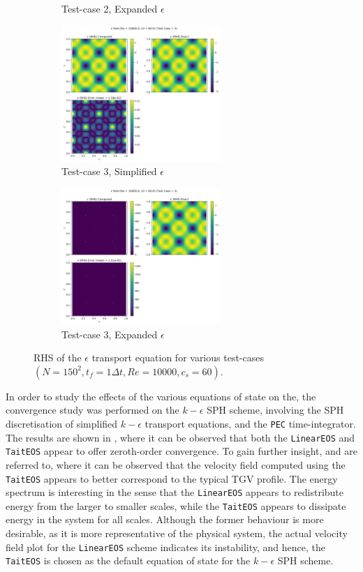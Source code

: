 \begin{figure}[H]
\begin{subfigure}{7cm}
    \caption{Test-case 2, Expanded $\epsilon$}
  \end{subfigure}
  \begin{subfigure}{7cm}
    \centering\includegraphics[width=6cm]{Code-Figures/keps/keps-op-conv/c0_60_ke_expd_no_ketc_3_nx_150_re_10000/eps_rhs.png}
    \caption{Test-case 3, Simplified $\epsilon$}
  \end{subfigure}
  \begin{subfigure}{7cm}
    \centering\includegraphics[width=6cm]{Code-Figures/keps/keps-op-conv/c0_60_ke_expd_yes_ketc_3_nx_150_re_10000/eps_rhs.png}
    \caption{Test-case 3, Expanded $\epsilon$}
  \end{subfigure}
  \caption{RHS of the $\epsilon$ transport equation for various test-cases $(N=150^2, t_f=1\Delta t, Re=10000, c_s=60)$.}
  \label{fig:eps-spatial-ooc-field}
\end{figure}


In order to study the effects of the various equations of state on the, the convergence study was performed on the $k-\epsilon$ SPH scheme, involving the SPH discretisation of simplified $k-\epsilon$ transport equations, and the \texttt{PEC} time-integrator.
The results are shown in , where it can be observed that both the \texttt{LinearEOS} and \texttt{TaitEOS} appear to offer zeroth-order convergence.
To gain further insight,  and  are referred to, where it can be observed that the velocity field computed using the \texttt{TaitEOS} appears to better correspond to the typical TGV profile.
The energy spectrum is interesting in the sense that the \texttt{LinearEOS} appears to redistribute energy from the larger to smaller scales, while the \texttt{TaitEOS} appears to dissipate energy in the system for all scales.
Although the former behaviour is more desirable, as it is more representative of the physical system, the actual velocity field plot for the \texttt{LinearEOS} scheme indicates its instability, and hence, the \texttt{TaitEOS} is chosen as the default equation of state for the $k-\epsilon$ SPH scheme.

